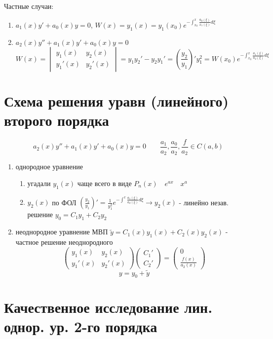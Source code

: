\documentclass{article}
\begin{document}
Частные случаи:
\begin{enumerate}
  \item $a_1(x)y'+a_0(x)y=0$, $W(x)=y_1(x)=y_1(x_0)e^{-\int_{x_0}^{x}\frac{a_0(\xi)}{x_1(\xi)}d\xi}$
  \item $a_2(x)y''+a_1(x)y'+a_0(x)y=0$
    \[
      W(x)=\begin{vmatrix}
        y_1(x) & y_2(x) \\ 
        y_1'(x) & y_2'(x)
      \end{vmatrix}=y_1y_2'-y_2y_1'=\left(\frac{y_2}{y_1}\right)'y_1^2=W(x_0)e^{-\int_{x_0}^{x}\frac{a_1(\xi)}{a_2(\xi)}d\xi}
    \]
\end{enumerate}

\section{Схема решения уравн (линейного) второго порядка}
\[
  a_2(x)y''+a_1(x)y'+a_0(x)y=0 \qquad \frac{a_1}{a_2},\frac{a_0}{a_2},\frac{f}{a_2} \in C(a,b)
\]
\begin{enumerate}
\item однородное уравнение
  \begin{enumerate}
    \item угадали $y_1(x)$ чаще всего в виде $P_n(x) \quad e^{ax} \quad x^{a}$
    \item $y_2(x)$ по ФОЛ $\left(\frac{y_2}{y_1}\right)'=\frac{1}{y_1^2}e^{-\int^{x}\frac{a_1(\xi)}{a_2(\xi)}d\xi} \rightarrow y_2(x)$
      - линейно незав. решение $y_0=C_1y_1+C_2y_2$
  \end{enumerate}
\item неоднородное уравнение МВП
$\tilde y=C_1(x)y_1(x)+C_2(x)y_2(x)$ - частное решение неоднородного
\[
  \begin{pmatrix}
    y_1(x) & y_2(x) \\ 
    y_1'(x) & y_2'(x)
  \end{pmatrix}\begin{pmatrix}
    C_1' \\ 
    C_2'
  \end{pmatrix} = \begin{pmatrix}
    0 \\ 
    \frac{f(x)}{a_2(x)}
  \end{pmatrix}
\]
\[
  y=y_0+\tilde y
\]
\end{enumerate}

\section{Качественное исследование лин. однор. ур. 2-го порядка}
\end{document}
